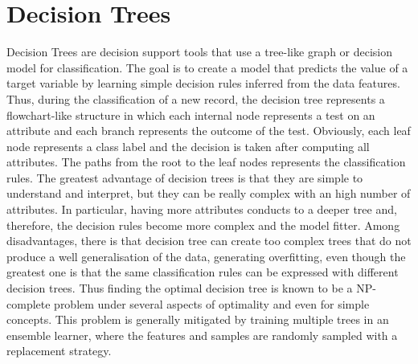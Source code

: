 \documentclass[final,a4paper,12pt,english]{UnicaPhdThesis3}
\begin{document}
	\section{Decision Trees} \label{DT}
	Decision Trees \cite{Quinlan} are decision support tools that use a tree-like graph or decision model for classification. The goal is to create a model that predicts the value of a target variable by learning simple decision rules inferred from the data features. Thus, during the classification of a new record, the decision tree represents a flowchart-like structure in which each internal node represents a test on an attribute and each branch represents the outcome of the test. Obviously, each leaf node represents a class label and the decision is taken after computing all attributes. The paths from the root to the leaf nodes represents the classification rules. The greatest advantage of decision trees is that they are simple to understand and interpret, but they can be really complex with an high number of attributes. In particular, having more attributes conducts to a deeper tree and, therefore, the decision rules become more complex and the model fitter.
	Among disadvantages, there is that decision tree can create too complex trees that do not produce a well generalisation of the data, generating overfitting, even though the greatest one is that the same classification rules can be expressed with different decision trees. Thus finding the optimal decision tree is known to be a NP-complete problem under several aspects of optimality and even for simple concepts. This problem is generally mitigated by training multiple trees in an ensemble learner, where the features and samples are randomly sampled with a replacement strategy.
	
\end{document}
